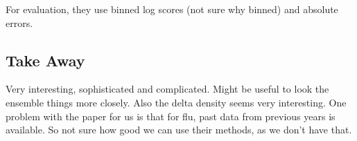 For evaluation, they use binned log scores (not sure why binned) and absolute errors. 

\subsection{Take Away}
Very interesting, sophisticated and complicated. Might be useful to look the ensemble things more closely. Also the delta density seems very interesting. One problem with the paper for us is that for flu, past data from previous years is available. So not sure how good we can use their methods, as we don't have that. 



